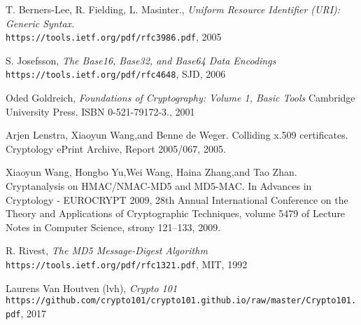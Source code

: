 \begin{thebibliography}{9}

T. Berners-Lee, R. Fielding, L. Masinter.,
\textit{Uniform Resource Identifier (URI): Generic Syntax.} \\ 
\texttt{https://tools.ietf.org/pdf/rfc3986.pdf}, 2005

S. Josefsson,
\textit{The Base16, Base32, and Base64 Data Encodings} \\ 
\texttt{https://tools.ietf.org/pdf/rfc4648}, SJD, 2006

Oded Goldreich,
\textit{Foundations of Cryptography: Volume 1, Basic Tools}  
Cambridge University Press. ISBN 0-521-79172-3., 2001

Arjen Lenstra, Xiaoyun Wang,and Benne de Weger. Colliding
x.509 certificates. Cryptology ePrint Archive, Report 2005/067,
2005.

Xiaoyun Wang, Hongbo Yu,Wei Wang, Haina Zhang,and Tao Zhan. Cryptanalysis on HMAC/NMAC-MD5 and MD5-MAC. In Advances in Cryptology - EUROCRYPT 2009, 28th Annual International Conference on the Theory and Applications of Cryptographic Techniques, volume 5479 of Lecture Notes in Computer Science, strony 121–133, 2009.

R. Rivest,
\textit{The MD5 Message-Digest Algorithm} \\ 
\texttt{https://tools.ietf.org/pdf/rfc1321.pdf}, MIT, 1992

Laurens Van Houtven (lvh),
\textit{Crypto 101} \\ 
\texttt{https://github.com/crypto101/crypto101.github.io/raw/master/Crypto101.pdf}, 2017


\end{thebibliography}